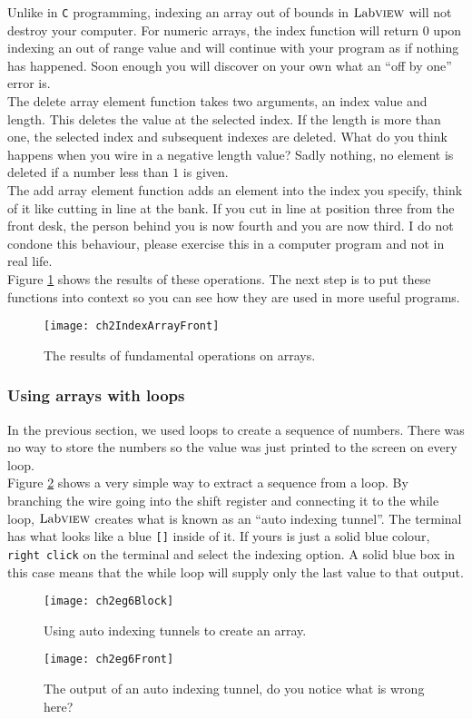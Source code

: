 Unlike in \texttt{C} programming, indexing an array out of bounds in $\text{Lab}\textsc{view}$ will not destroy your computer. For numeric arrays, the index function will return $0$ upon indexing an out of range value and will continue with your program as if nothing has happened. Soon enough you will discover on your own what an ``off by one'' error is.\\

The delete array element function takes two arguments, an index value and length. This deletes the value at the selected index. If the length is more than one, the selected index and subsequent indexes are deleted. What do you think happens when you wire in a negative length value? Sadly nothing, no element is deleted if a number less than $1$ is given.\\

The add array element function adds an element into the index you specify, think of it like cutting in line at the bank. If you cut in line at position three from the front desk, the person behind you is now fourth and you are now third. I do not condone this behaviour, please exercise this in a computer program and not in real life.\\

Figure \ref{ch2IndexArrayFront} shows the results of these operations. The next step is to put these functions into context so you can see how they are used in more useful programs.\\
\begin{figure}
	\centering
	\texttt{[image: ch2IndexArrayFront]}
	\caption{The results of fundamental operations on arrays.}
	\label{ch2IndexArrayFront}
\end{figure}

\subsubsection{Using arrays with loops}
In the previous section, we used loops to create a sequence of numbers. There was no way to store the numbers so the value was just printed to the screen on every loop.\\

Figure \ref{ch2eg6Block} shows a very simple way to extract a sequence from a loop. By branching the wire going into the shift register and connecting it to the while loop, $\text{Lab}\textsc{view}$ creates what is known as an ``auto indexing tunnel''. The terminal has what looks like a blue \texttt{[]} inside of it. If yours is just a solid blue colour, \texttt{right click} on the terminal and select the indexing option. A solid blue box in this case means that the while loop will supply only the last value to that output.\\
\begin{figure}
	\centering
	\texttt{[image: ch2eg6Block]}
	\caption{Using auto indexing tunnels to create an array.}
	\label{ch2eg6Block}
\end{figure}
\begin{figure}
	\centering
	\texttt{[image: ch2eg6Front]}
	\caption{The output of an auto indexing tunnel, do you notice what is wrong here?}
	\label{ch2eg6Front}
\end{figure}

